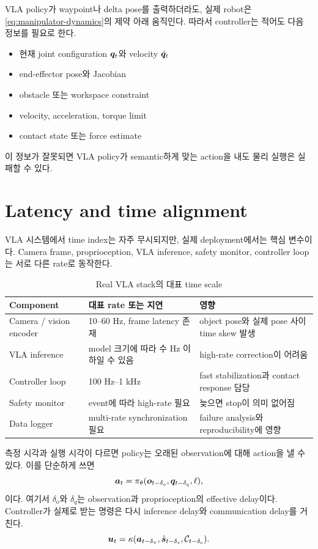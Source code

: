 VLA policy가 waypoint나 delta pose를 출력하더라도, 실제 robot은 \cref{eq:manipulator-dynamics}의 제약 아래 움직인다. 따라서 controller는 적어도 다음 정보를 필요로 한다.

\begin{itemize}
  \item 현재 joint configuration $\bm{q}_t$와 velocity $\dot{\bm{q}}_t$
  \item end-effector pose와 Jacobian
  \item obstacle 또는 workspace constraint
  \item velocity, acceleration, torque limit
  \item contact state 또는 force estimate
\end{itemize}

이 정보가 잘못되면 VLA policy가 semantic하게 맞는 action을 내도 물리 실행은 실패할 수 있다.

\section{Latency and time alignment}

VLA 시스템에서 time index는 자주 무시되지만, 실제 deployment에서는 핵심 변수이다. Camera frame, proprioception, VLA inference, safety monitor, controller loop는 서로 다른 rate로 동작한다.

\begin{table}[ht]
\centering
\caption{Real VLA stack의 대표 time scale}
\label{tab:timescale}
\small
\begin{tabularx}{\textwidth}{p{34mm}X X}
\toprule
Component & 대표 rate 또는 지연 & 영향 \\
\midrule
Camera / vision encoder & 10--60 Hz, frame latency 존재 & object pose와 실제 pose 사이 time skew 발생 \\
VLA inference & model 크기에 따라 수 Hz 이하일 수 있음 & high-rate correction이 어려움 \\
Controller loop & 100 Hz--1 kHz & fast stabilization과 contact response 담당 \\
Safety monitor & event에 따라 high-rate 필요 & 늦으면 stop이 의미 없어짐 \\
Data logger & multi-rate synchronization 필요 & failure analysis와 reproducibility에 영향 \\
\bottomrule
\end{tabularx}
\end{table}

측정 시각과 실행 시각이 다르면 policy는 오래된 observation에 대해 action을 낼 수 있다. 이를 단순하게 쓰면
\begin{equation}
  \bm{a}_t = \pi_\theta(\bm{o}_{t-\delta_o}, \bm{q}_{t-\delta_q}, \ell),
  \label{eq:delayed-policy}
\end{equation}
이다. 여기서 $\delta_o$와 $\delta_q$는 observation과 proprioception의 effective delay이다. Controller가 실제로 받는 명령은 다시 inference delay와 communication delay를 거친다.
\begin{equation}
  \bm{u}_t = \kappa(\bm{a}_{t-\delta_\pi}, \hat{\bm{s}}_{t-\delta_s}, \mathcal{C}_{t-\delta_c}).
  \label{eq:delayed-control}
\end{equation}

